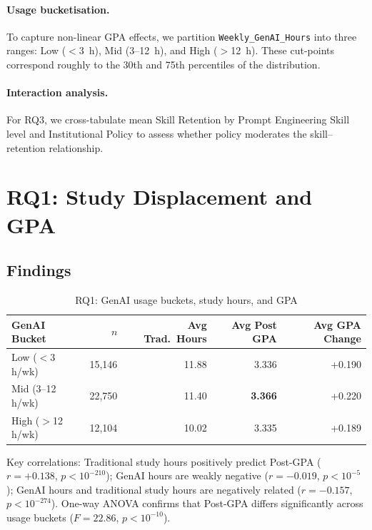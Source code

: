 \documentclass[11pt]{article}
\begin{document}
\paragraph{Usage bucketisation.}
To capture non-linear GPA effects, we partition \texttt{Weekly\_GenAI\_Hours}
into three ranges: Low ($<$3~h), Mid (3--12~h), and High ($>$12~h). These
cut-points correspond roughly to the 30th and 75th percentiles of the
distribution.

\paragraph{Interaction analysis.}
For RQ3, we cross-tabulate mean Skill Retention by Prompt Engineering Skill
level and Institutional Policy to assess whether policy moderates the
skill--retention relationship.

\section{RQ1: Study Displacement and GPA}
\label{sec:rq1}

\subsection*{Findings}

\begin{table}[htbp]
\centering
\caption{RQ1: GenAI usage buckets, study hours, and GPA}
\label{tab:rq1}
\begin{tabular}{lrrrr}
\toprule
GenAI Bucket & $n$ & Avg Trad.\ Hours & Avg Post GPA & Avg GPA Change \\
\midrule
Low ($<$3 h/wk)   & 15{,}146 & 11.88 & 3.336 & +0.190 \\
Mid (3--12 h/wk)  & 22{,}750 & 11.40 & \textbf{3.366} & +0.220 \\
High ($>$12 h/wk) & 12{,}104 & 10.02 & 3.335 & +0.189 \\
\bottomrule
\end{tabular}
\end{table}

Key correlations: Traditional study hours positively predict Post-GPA
($r = +0.138$, $p < 10^{-210}$); GenAI hours are weakly negative
($r = -0.019$, $p < 10^{-5}$); GenAI hours and traditional study hours are
negatively related ($r = -0.157$, $p < 10^{-274}$). One-way ANOVA confirms that
Post-GPA differs significantly across usage buckets ($F = 22.86$,
$p < 10^{-10}$).
\end{document}
